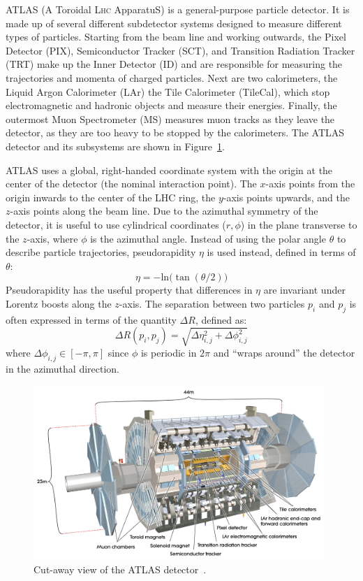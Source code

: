﻿ATLAS (A Toroidal L{\scshape hc} ApparatuS) is a general-purpose particle detector.
It is made up of several different subdetector systems designed to measure different types of particles.
Starting from the beam line and working outwards, the Pixel Detector (PIX), Semiconductor Tracker (SCT), and Transition Radiation Tracker (TRT) make up the Inner Detector (ID) and are responsible for measuring the trajectories and momenta of charged particles.
Next are two calorimeters, the Liquid Argon Calorimeter (LAr) the Tile Calorimeter (TileCal), which stop electromagnetic and hadronic objects and measure their energies.
Finally, the outermost Muon Spectrometer (MS) measures muon tracks as they leave the detector, as they are too heavy to be stopped by the calorimeters.
The ATLAS detector and its subsystems are shown in Figure~\ref{fig:atlas}.

ATLAS uses a global, right-handed coordinate system with the origin at the center of the detector (the nominal interaction point).
The $x$-axis points from the origin inwards to the center of the LHC ring, the $y$-axis points upwards, and the $z$-axis points along the beam line.
Due to the azimuthal symmetry of the detector, it is useful to use cylindrical coordinates ($r,\phi$) in the plane transverse to the $z$-axis, where $\phi$ is the azimuthal angle.
Instead of using the polar angle $\theta$ to describe particle trajectories, pseudorapidity $\eta$ is used instead, defined in terms of $\theta$:
\begin{equation}
  \eta = -\mathrm{ln}\big(\tan(\theta/2)\big)
  \label{eq:eta}
\end{equation}
Pseudorapidity has the useful property that differences in $\eta$ are invariant under Lorentz boosts along the $z$-axis.
The separation between two particles $p_i$ and $p_j$ is often expressed in terms of the quantity $\Delta R$, defined as:
\begin{equation}
  \Delta R(p_i,p_j) = \sqrt{\Delta\eta_{i,j}^2 + \Delta\phi_{i,j}^2}
  \label{eq:deltar}
\end{equation}
where $\Delta\phi_{i,j} \in [-\pi,\pi]$ since $\phi$ is periodic in $2\pi$ and ``wraps around'' the detector in the azimuthal direction.

\begin{figure}[tbp]
  \begin{center}
    \includegraphics[width=0.98\textwidth]{figs/detector/atlas.pdf}
  \end{center}
  \caption[Cut-away view of the ATLAS detector.]{Cut-away view of the ATLAS detector~\cite{PERF-2007-01}.}
  \label{fig:atlas}
\end{figure}
